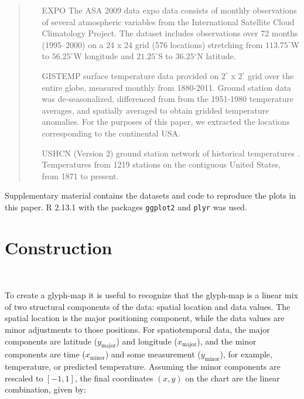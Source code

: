 \documentclass[oneside]{article}
\newcommand\amin{\text{minor}}
\newcommand\amaj{\text{major}}
\begin{document}
\begin{quote}
\begin{itemize} \itemsep 0in

\item[EXPO] The ASA 2009 data expo data \citep{murrell:2010} consists
  of monthly observations of several atmospheric variables from the
  International Satellite Cloud Climatology Project. The dataset
  includes observations over 72 months (1995--2000) on a 24 x 24 grid
  (576 locations) stretching from $113.75^{\circ}$W to
  $56.25^{\circ}$W longitude and $21.25^{\circ}$S to $36.25{^\circ}$N
  latitude.

\item[GISTEMP] surface temperature data provided on $2^{\circ}$ x
  $2^{\circ}$ grid over the entire globe, measured monthly
  \citep{GISTEMP} from 1880-2011. Ground station data was de-seasonalized,
  differenced from from the 1951-1980 temperature averages, and
  spatially averaged to obtain gridded temperature anomalies. For the
  purposes of this paper, we extracted the locations corresponding to
  the continental USA.

\item[USHCN] (Version 2) ground station network of historical
  temperatures \citep{USHCN}. Temperatures from 1219 stations on the
  contiguous United States, from 1871 to present.
  
\end{itemize}
\end{quote}
Supplementary material contains the datasets and code to reproduce the plots in this paper.  R 2.13.1 \citep{R} with the packages {\tt ggplot2} \citep{me:ggplot2} and {\tt plyr} \citep{me:plyr} was used. 


\section{Construction}~\label{sec:construction}

To create a glyph-map it is useful to recognize that the glyph-map is a linear mix of two structural components of the data: spatial location and data values. The spatial location is the major positioning component, while the data values are minor adjustments to those positions. For spatiotemporal data, the major components are latitude ($y_{\amaj}$) and longitude ($x_{\amaj}$), and the minor components are time ($x_{\amin}$) and some measurement ($y_{\amin}$), for example, temperature, or predicted temperature. Assuming the minor components are rescaled to $[-1, 1]$, the final coordinates $(x,y)$ on the chart are the linear combination, given by:
\end{document}
